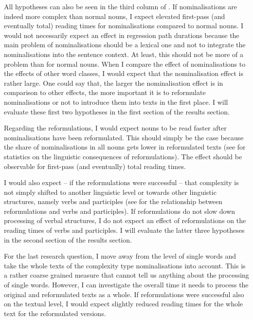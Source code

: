\documentclass[output=paper]{langsci/langscibook}
\begin{document}
All hypotheses can also be seen in the third column of . If nominalisations are indeed more complex than normal nouns, I expect elevated first-pass (and eventually total) reading times for nominalisations compared to normal nouns. I would not necessarily expect an effect in regression path durations because the main problem of nominalisations should be a lexical one and not to integrate the nominalisations into the sentence context. At least, this should not be more of a problem than for normal nouns. When I compare the effect of nominalisations to the effects of other word classes, I would expect that the nominalisation effect is rather large. One could say that, the larger the nominalisation effect is in comparison to other effects, the more important it is to reformulate nominalisations or not to introduce them into texts in the first place. I will evaluate these first two hypotheses in the first section of the results section.

Regarding the reformulations, I would expect nouns to be read faster after nominalisations have been reformulated. This should simply be the case because the share of nominalisations in all nouns gets lower in reformulated texts (see  for statistics on the linguistic consequences of reformulations). The effect should be observable for first-pass (and eventually) total reading times.

I would also expect -- if the reformulations were successful -- that complexity is not simply shifted to another linguistic level or towards other linguistic structures, namely verbs and participles (see  for the relationship between reformulations and verbs and participles). If reformulations do not slow down processing of verbal structures, I do not expect an effect of reformulations on the reading times of verbs and participles. I will evaluate the latter three hypotheses in the second section of the results section.

For the last research question, I move away from the level of single words and take the whole texts of the complexity type nominalisations into account. This is a rather coarse grained measure that cannot tell us anything about the processing of single words. However, I can investigate the overall time it needs to process the original and reformulated texts as a whole. If reformulations were successful also on the textual level, I would expect slightly reduced reading times for the whole text for the reformulated versions.
\end{document}
